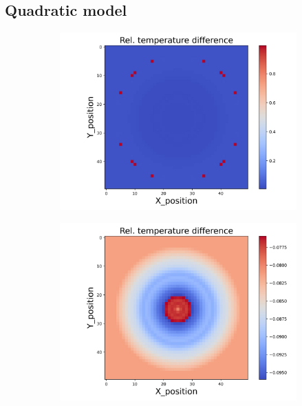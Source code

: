 \subsection{Quadratic model}
\begin{figure}[h]
    \centering
    \begin{minipage}{\textwidth}
        \centering
        \begin{subfigure}{0.325\textwidth}
            \centering
            \includegraphics[width=\textwidth]{figures/raw_data/0/quad/T_bias.jpg}
        \end{subfigure}
        \begin{subfigure}{0.325\textwidth}
            \centering
            \includegraphics[width=\textwidth]{figures/raw_data/5/quad/T_bias.jpg}

\end{subfigure}
\end{minipage}
\end{figure}
